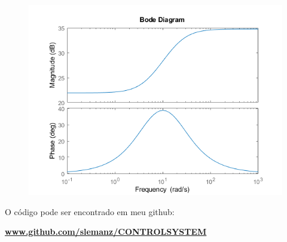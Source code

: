 \documentclass{layout}
\begin{document}
\begin{figure}[H]
    \centering 
 	\includegraphics[width=\textwidth]{images/figure6.png}
\end{figure}

\noindent O código pode ser encontrado em meu github:

\href{https://github.com/slemanz/CONTROL_SYSTEM/blob/main/MATLAB/LEAD_COMPENSATOR/Gain_Kc.m}{\bfseries \color{BlueViolet} www.github.com/slemanz/CONTROL\textunderscore SYSTEM}
\end{document}
